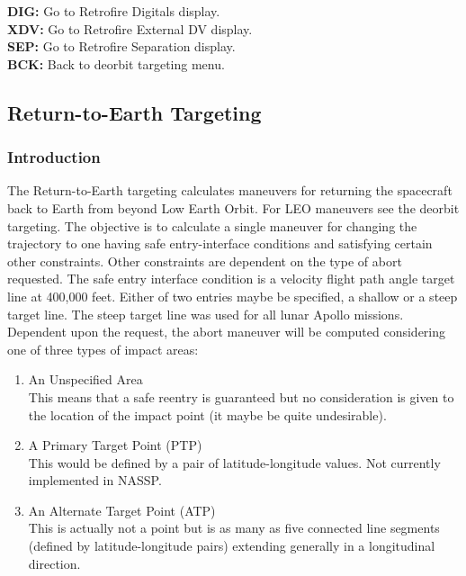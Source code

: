 \documentclass[11pt]{article} %
\begin{document}
\textbf{DIG:} Go to Retrofire Digitals display.\\
\textbf{XDV:} Go to Retrofire External DV display.\\
\textbf{SEP:} Go to Retrofire Separation display.\\
\textbf{BCK:} Back to deorbit targeting menu.\\

\newpage
\subsection{Return-to-Earth Targeting}

\subsubsection{Introduction}

The Return-to-Earth targeting calculates maneuvers for returning the spacecraft back to Earth from beyond Low Earth Orbit. For LEO maneuvers see the deorbit targeting. The objective is to calculate a single maneuver for changing the trajectory to one having safe entry-interface conditions and satisfying certain other constraints. Other constraints are dependent on the type of abort requested. The safe entry interface condition is a velocity flight path angle target line at 400,000 feet. Either of two entries maybe be specified, a shallow or a steep target line. The steep target line was used for all lunar Apollo missions.\\

Dependent upon the request, the abort maneuver will be computed considering one of three types of impact areas:

\begin{enumerate}
	\item An Unspecified Area\\
	This means that a safe reentry is guaranteed but no consideration is given to the location of the impact point (it maybe be quite undesirable).
	\item A Primary Target Point (PTP)\\
	This would be defined by a pair of latitude-longitude values. Not currently implemented in NASSP.
	\item An Alternate Target Point (ATP)\\
	This is actually not a point but is as many as five connected line segments (defined by latitude-longitude pairs) extending generally in a longitudinal direction.\\
\end{enumerate}
\end{document}
